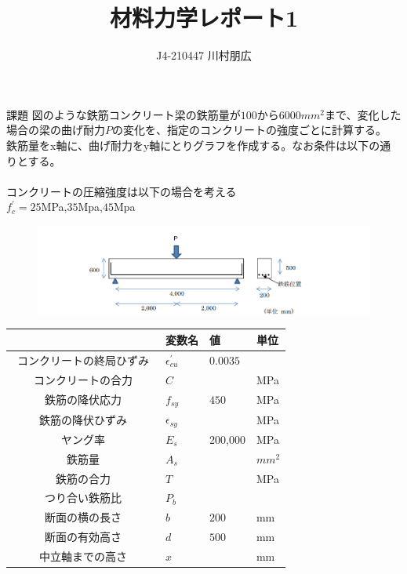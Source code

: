 \documentclass[pdflatex,ja=standard,fleqn]{bxjsarticle}
\title{材料力学レポート1}
\author{J4-210447 川村朋広}
\begin{document}
\maketitle
\begin{itembox}[l]{課題}
    図のような鉄筋コンクリート梁の鉄筋量が$100$から$6000mm^2$まで、変化した場合の梁の曲げ耐力$P$の変化を、指定のコンクリートの強度ごとに計算する。\\
    鉄筋量をx軸に、曲げ耐力をy軸にとりグラフを作成する。なお条件は以下の通りとする。\\\\
    コンクリートの圧縮強度は以下の場合を考える\\
    \quad$f^{\prime}_{c}=25$MPa,$35$Mpa,$45$Mpa
\end{itembox}
\begin{figure}[htbp]
    \centering
    \includegraphics[width=15cm]{2023-01-15.png}
\end{figure}
\begin{table}[htbp]
    \centering
    \begin{tabular}{clll}
         & 変数名 & 値 & 単位\\ \hline
        コンクリートの終局ひずみ　& $\epsilon^{\prime}_{cu}$ & $0.0035$ & \\
        コンクリートの合力 & $C$ & & MPa\\
        鉄筋の降伏応力　& $f_{sy}$ & $450$ & MPa\\
        鉄筋の降伏ひずみ & $\epsilon_{sy}$ & & MPa\\
        ヤング率 & $E_{s}$ & 200,000 & MPa\\
        鉄筋量 & $A_{s}$ & & $mm^2$\\
        鉄筋の合力 & $T$ & & MPa\\
        つり合い鉄筋比 & $P_{b}$ & & \\
        断面の横の長さ & $b$ & $200$ & mm\\
        断面の有効高さ & $d$ & $500$ & mm\\
        中立軸までの高さ & $x$ & & mm
    \end{tabular}
\end{table}
\end{document}
